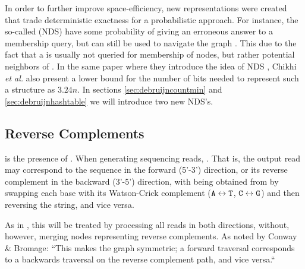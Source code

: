 In order to further improve space-efficiency, new  representations were created that trade deterministic exactness for a probabilistic approach. For instance, the so-called  (NDS) have some probability of giving an erroneous answer to a membership query, 
but can still be used to navigate the graph \cite{Chikhi2014}. This  due to the fact that a \dBG is usually not queried for membership of  nodes, but rather  potential neighbors of . In the same paper where they introduce
the idea of NDS \cite{Chikhi2014}, Chikhi \emph{et al.} also present a lower bound for the number of bits needed to represent such a structure as $3.24n$.
In sections \ref{sec:debruijncountmin} and \ref{sec:debruijnhashtable} we will introduce two new NDS's. 

\subsection{Reverse Complements}

 is the presence of . When generating sequencing reads, . That is, the output read may correspond to the sequence  in the forward (5'-3') direction, or its reverse complement  in the backward (3'-5') direction, with
 being obtained from  by swapping each base with its Watson-Crick complement
($\mathtt{A} \leftrightarrow \mathtt{T}$, $\mathtt{C} \leftrightarrow \mathtt{G}$) and then reversing the string, and vice versa. 

As in \cite{Conway2011}, this will be treated by processing
all reads in both directions, without, however, merging nodes representing reverse complements. As noted by Conway \& Bromage: ``This
makes the graph symmetric; a forward traversal corresponds to a backwards traversal on the reverse complement path, and vice versa.``
\cite{Conway2011}


